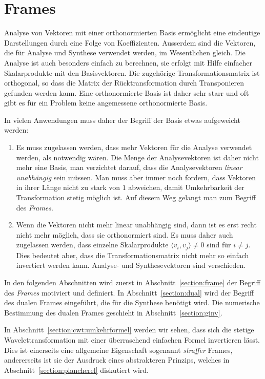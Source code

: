 %
%
%
\chapter{Frames
\label{chapter:frames}}
Analyse von Vektoren mit einer orthonormierten Basis ermöglicht eine
eindeutige Darstellungen durch eine Folge von Koeffizienten. 
Ausserdem sind die Vektoren, die für Analyse und Synthese verwendet
werden, im Wesentlichen gleich.
Die Analyse ist auch besonders einfach zu berechnen,
sie erfolgt mit Hilfe einfacher Skalarprodukte mit den Basisvektoren.
Die zugehörige Transformationsmatrix ist orthogonal, so dass die
Matrix der Rücktransformation durch Transponieren gefunden werden kann.
Eine orthonormierte Basis ist daher sehr starr und oft gibt es für ein
Problem keine angemessene orthonormierte Basis.

In vielen Anwendungen muss daher der Begriff der Basis etwas aufgeweicht
werden:
\begin{enumerate}
\item
Es muss zugelassen werden, dass mehr Vektoren für die Analyse verwendet
werden, als notwendig wären.
Die Menge der Analysevektoren ist daher nicht mehr eine Basis, man
verzichtet darauf, dass die Analysevektoren {\em linear unabhängig} sein
müssen.
Man muss aber immer noch fordern, dass Vektoren in ihrer Länge nicht
zu stark von $1$ abweichen,
damit Umkehrbarkeit der Transformation stetig möglich ist.
Auf diesem Weg gelangt man zum Begriff des {\em Frames}.
\item
Wenn die Vektoren nicht mehr linear unabhängig sind, dann ist es erst
recht nicht mehr möglich, dass sie orthonormiert sind.
Es muss daher auch zugelassen werden, dass einzelne Skalarprodukte 
$\langle v_i,v_j\rangle\ne 0$ sind für $i\ne j$.
Dies bedeutet aber, dass die Transformationsmatrix nicht mehr so einfach
invertiert werden kann.
Analyse- und Synthesevektoren sind verschieden.
\end{enumerate}
In den folgenden Abschnitten wird zuerst in Abschnitt~\ref{section:frame}
der Begriff des {\em Frames} motiviert und definiert.
%
In Abschnitt~\ref{section:dual} wird der Begriff des dualen Frames
eingeführt, die für die Synthese benötigt wird.
Die numerische Bestimmung des dualen Frames geschieht in
Abschnitt~\ref{section:ginv}.

In Abschnitt~\ref{section:cwt:umkehrformel} werden wir sehen, dass sich
%
die stetige Wavelettransformation mit einer überraschend einfachen
Formel invertieren lässt.
Dies ist einerseits eine allgemeine Eigenschaft sogenannt {\em straffer}
Frames, andererseits ist sie der Ausdruck eines abstrakteren Prinzips,
welches in Abschnitt~\ref{section:plancherel} diskutiert wird.

